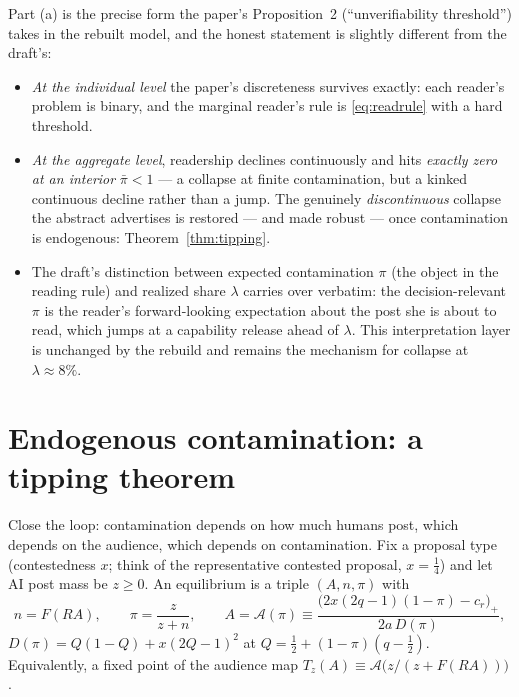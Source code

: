 \documentclass[11pt]{article}
\theoremstyle{remark}
\begin{document}
Part (a) is the precise form the paper's Proposition~2 (``unverifiability
threshold'') takes in the rebuilt model, and the honest statement is slightly
different from the draft's:
\begin{itemize}[itemsep=1pt]
\item \emph{At the individual level} the paper's discreteness survives exactly:
each reader's problem is binary, and the marginal reader's rule is
\eqref{eq:readrule} with a hard threshold.
\item \emph{At the aggregate level}, readership declines continuously and hits
\emph{exactly zero at an interior} $\bar\pi<1$ --- a collapse at finite
contamination, but a kinked continuous decline rather than a jump. The
genuinely \emph{discontinuous} collapse the abstract advertises is restored ---
and made robust --- once contamination is endogenous:
Theorem~\ref{thm:tipping}.
\item The draft's distinction between expected contamination $\pi$ (the object
in the reading rule) and realized share $\lambda$ carries over verbatim: the
decision-relevant $\pi$ is the reader's forward-looking expectation about the
post she is about to read, which jumps at a capability release ahead of
$\lambda$. This interpretation layer is unchanged by the rebuild and remains the
mechanism for collapse at $\lambda\approx8\%$.
\end{itemize}

\section{Endogenous contamination: a tipping theorem}
\label{sec:tipping}

Close the loop: contamination depends on how much humans post, which depends on
the audience, which depends on contamination. Fix a proposal type (contestedness
$x$; think of the representative contested proposal, $x=\tfrac14$) and let AI
post mass be $z\ge0$. An equilibrium is a triple $(A,n,\pi)$ with
\[
n=F(RA),\qquad \pi=\frac{z}{z+n},\qquad
A=\mathcal{A}(\pi)\equiv\frac{\bigl(2x(2q-1)(1-\pi)-c_r\bigr)_+}{2a\,D(\pi)},
\]
$D(\pi)=Q(1-Q)+x(2Q-1)^2$ at $Q=\tfrac12+(1-\pi)(q-\tfrac12)$. Equivalently, a
fixed point of the audience map
$T_z(A)\equiv\mathcal{A}\bigl(z/(z+F(RA))\bigr)$.
\end{document}
